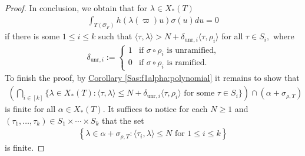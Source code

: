 \documentclass[10pt]{amsart}
\theoremstyle{definition}
\newtheorem{remark}[theorem]{Remark}
\numberwithin{equation}{section}
\numberwithin{equation}{subsection}
\begin{document}
\begin{proof}
In conclusion, we obtain that for $\lambda\in X_\ast(T)$
\begin{align*}
    \int_{T(\mathcal{O}_F)} h(\lambda(\varpi)u) \sigma(u)du = 0 
\end{align*}
if there is some $1\le i\le k$ such that $\langle \tau,\lambda\rangle>N+\delta_{\mathrm{unr},i}\langle \tau,\rho_i\rangle$ for all $\tau\in S_i,$ where 
\begin{align*}
    \delta_{\mathrm{unr},i}:=\begin{cases}
        1 & \textrm{if } \sigma\circ \rho_i \textrm{ is unramified,}\\
        0 & \textrm{if } \sigma\circ \rho_i \textrm{ is ramified.}
    \end{cases}
\end{align*}
To finish the proof, by \hyperref[Sas:f1alpha:polynomial]{Corollary \ref{Sas:f1alpha:polynomial}} it remains to show that
\begin{align*}
    \left(\bigcap_{i\in[k]} \{\lambda\in X_*(T): \langle \tau,\lambda\rangle \le  N+\delta_{\mathrm{unr},i}\langle \tau,\rho_i\rangle \text{ for some }\tau\in S_i\}\right) \cap (\alpha + \sigma_{\rho,T})
\end{align*}
is finite for all $\alpha\in X_*(T)$. It suffices to notice for each $N\geq 1$ and $(\tau_1,\ldots,\tau_k)\in S_1\times\cdots\times S_k$ that the set 
\begin{align*}
    \left\{\lambda\in \alpha+\sigma_{\rho,T}: \langle\tau_i,\lambda\rangle \leq N\text{ for }1\leq i\leq k \right\}
\end{align*}
is finite. %
\end{proof}

\end{document}
